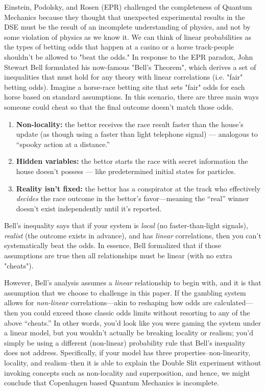 \documentclass{report}
\begin{document}
Einstein, Podolsky, and Rosen (EPR) challenged the completeness of Quantum Mechanics because they thought that unexpected experimental results in the DSE must be the result of an incomplete understanding of physics, and not by some violation of physics as we know it. We can think of linear probabilities as the types of betting odds that happen at a casino or a horse track-people shouldn't be allowed to "beat the odds." In response to the EPR paradox, John Stewart Bell formulated his now-famous "Bell's Theorem", which derives a set of inequalities that must hold for any theory with linear correlations (i.e. "fair" betting odds). Imagine a horse-race betting site that sets "fair" odds for each horse based on standard assumptions. In this scenario, there are three main ways someone could cheat so that the final outcome doesn't match those odds. 
\begin{enumerate}
    \item \textbf{Non-locality:} the bettor receives the race result faster than the house's update (as though using a faster than light telephone signal) — analogous to “spooky action at a distance.”
    \item \textbf{Hidden variables:} the bettor starts the race with secret information the house doesn’t possess — like predetermined initial states for particles.
    \item \textbf{Reality isn’t fixed:} the bettor has a conspirator at the track who effectively \textit{decides} the race outcome in the bettor’s favor—meaning the “real” winner doesn’t exist independently until it’s reported.
\end{enumerate}
Bell’s inequality says that if your system is \textit{local} (no faster-than-light signals), \textit{realist} (the outcome exists in advance), and has \textit{linear} correlations, then you can’t systematically beat the odds. In essence, Bell formalized that if those assumptions are true then all relationships must be linear (with no extra "cheats").

However, Bell’s analysis assumes a \textit{linear} relationship to begin with, and it is that assumption that we choose to challenge in this paper. If the gambling system allows for \textit{non-linear} correlations—akin to reshaping how odds are calculated—then you could exceed those classic odds limits without resorting to any of the above “cheats.” In other words, you’d look like you were gaming the system under a linear model, but you wouldn’t actually be breaking locality or realism; you’d simply be using a different (non-linear) probability rule that Bell’s inequality does not address. Specifically, if your model has three properties--non-linearity, locality, and realism--then it is able to explain the Double Slit experiment without invoking concepts such as non-locality and superposition, and hence, we might conclude that Copenhagen based Quantum Mechanics is incomplete. 
\end{document}

